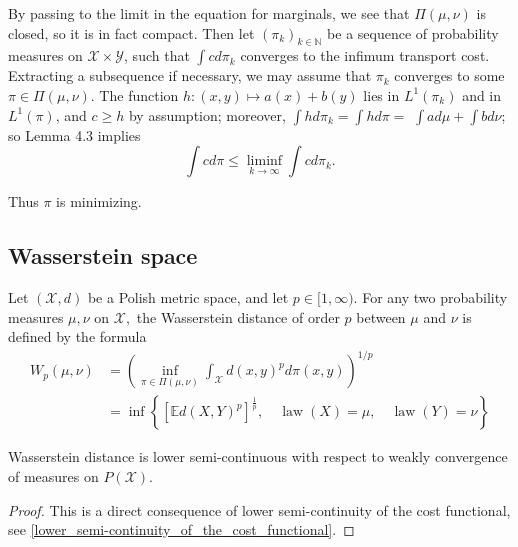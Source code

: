By passing to the limit in the equation for marginals, we see that \( \Pi ( \mu , \nu ) \) is closed, so it is in fact compact. Then let \( \left( \pi _ { k } \right) _ { k \in \mathbb { N } } \) be a sequence of probability measures on \( \mathcal { X } \times \mathcal { Y } \), such that \( \int c d \pi _ { k } \) converges to the infimum transport cost. Extracting a subsequence if necessary, we may assume that \( \pi _ { k } \) converges to some \( \pi \in \Pi ( \mu , \nu ) . \) The function \( h: ( x , y ) \longmapsto a ( x ) + b ( y ) \) lies in \( L ^ { 1 } \left( \pi _ { k } \right) \) and in \( L ^ { 1 } ( \pi ) \), and \( c \geq h \) by assumption; moreover, \( \int h d \pi _ { k } = \int h d \pi = \) \( \int a d \mu + \int b d \nu \); so Lemma 4.3 implies
\[ \int c d \pi \leq \liminf _ { k \rightarrow \infty } \int c d \pi _ { k }. \]

Thus $\pi$ is minimizing.
\subsection{Wasserstein space}

\begin{defn}
	\label{Wasserstein_distance}
	Let  \(( \mathcal { X } , d ) \) be a Polish metric space, and let \( p \in [ 1 , \infty ) . \) For any two probability measures \( \mu , \nu \) on \( \mathcal { X } , \) the Wasserstein distance of order \( p \) between \( \mu \) and \( \nu \) is defined by the formula
	\begin{align*}
		W _ { p } ( \mu , \nu ) & = \left( \inf _ { \pi \in \Pi ( \mu , \nu ) } \int _ { \mathcal { X } } d ( x , y ) ^ { p } d \pi ( x , y ) \right) ^ { 1 / p }                                                      \\
		                        & = \inf \left\{ \left[ \mathbb { E } d ( X , Y ) ^ { p } \right] ^ { \frac { 1 } { p } } , \quad \operatorname { law } ( X ) = \mu , \quad \operatorname { law } ( Y ) = \nu \right\}
	\end{align*}
\end{defn}

\begin{lem}
	\label{lower_semicontinous_Wasserstein_distance}
	Wasserstein distance is lower semi-continuous with respect to weakly convergence of measures on $P(\mathscr{X})$.
\end{lem}

\begin{proof}
	This is a direct consequence of lower semi-continuity of the cost functional, see \cref{lower_semi-continuity_of_the_cost_functional}.
\end{proof}

